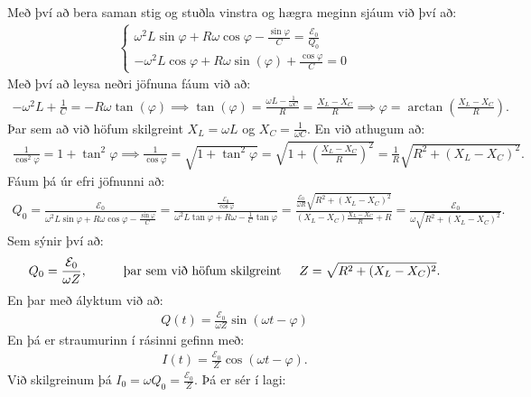 \ifdefined \wholebook \else\documentclass[oneside]{book}\usepackage{EdlBook}\graphicspath{{figures/}}
\begin{document}
Með því að bera saman stig og stuðla vinstra og hægra meginn sjáum við því að:
\begin{align*}
    \begin{cases}
    \omega^2 L \sin\varphi + R\omega \cos\varphi - \frac{\sin\varphi}{C} = \frac{\mathcal{E}_0}{Q_0} \\[10pt]
    -\omega^2 L \cos\varphi + R\omega \sin(\varphi) + \frac{\cos\varphi}{C} = 0
    \end{cases}
\end{align*}
Með því að leysa neðri jöfnuna fáum við að:
\begin{align*}
    -\omega^2 L + \frac{1}{C} = -R\omega \tan(\varphi) \implies \tan(\varphi) = \frac{\omega L - \frac{1}{\omega C}}{R} = \frac{X_L - X_C}{R} \implies \varphi = \arctan(\frac{X_L - X_C}{R}).
\end{align*}
Þar sem að við höfum skilgreint $X_L = \omega L$ og $X_C = \frac{1}{\omega C}$. En við athugum að:
\begin{align*}
    \frac{1}{\cos^2\varphi} = 1 + \tan^2\varphi \implies \frac{1}{\cos\varphi} = \sqrt{1 + \tan^2\varphi} = \sqrt{1 + \left( \frac{X_L- X_C}{R} \right)^2} = \frac{1}{R}\sqrt{R^2 + (X_L - X_C)^2}.
\end{align*}
Fáum þá úr efri jöfnunni að:
\begin{align*}
    Q_0 = \frac{\mathcal{E}_0}{\omega^2 L \sin\varphi + R\omega \cos\varphi - \frac{\sin\varphi}{C}} = \frac{\frac{\mathcal{E}_0}{\cos\varphi}}{\omega^2 L \tan\varphi + R\omega - \frac{1}{C}\tan\varphi} = \frac{\frac{\mathcal{E}_0}{\omega R}\sqrt{R^2 + (X_L - X_C)^2}}{(X_L - X_C) \frac{X_L-X_C}{R} + R} = \frac{\mathcal{E}_0}{\omega \sqrt{R^2 + (X_L-X_C)^2}}.
\end{align*}
Sem sýnir því að:
\begin{align*}
    Q_0 = \frac{\mathcal{E}_0}{\omega Z}, \hspace{1cm} \text{þar sem við höfum skilgreint} \hspace{0.5cm} Z = \sqrt{R^2 + (X_L - X_C)^2}.
\end{align*}
En þar með ályktum við að:
\begin{align*}
    Q(t) = \frac{\mathcal{E}_0}{\omega Z} \sin(\omega t - \varphi)
\end{align*}
En þá er straumurinn í rásinni gefinn með:
\begin{align*}
    I(t) = \frac{\mathcal{E}_0}{Z}\cos(\omega t - \varphi).
\end{align*}
Við skilgreinum þá $I_0 = \omega Q_0 = \frac{\mathcal{E}_0}{Z}$. Þá er sér í lagi:
\end{document}
